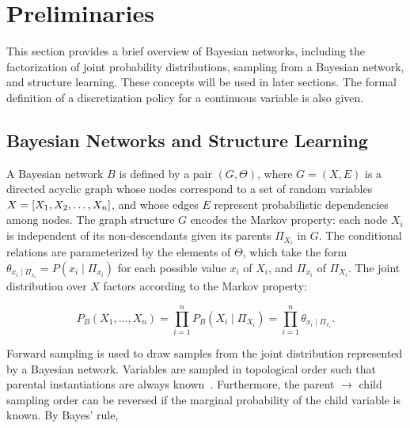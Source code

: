 
\section{Preliminaries}
\label{sec:preliminaries}
This section provides a brief overview of Bayesian networks, including the factorization of joint probability distributions, sampling from a Bayesian network, and structure learning. These concepts will be used in later sections. The formal definition of a discretization policy for a continuous variable is also given.

\subsection{Bayesian Networks and Structure Learning}


A Bayesian network $B$ is defined by a pair $(G,\Theta)$, where $G = (X,E)$ is a directed acyclic graph whose nodes correspond to a set of random variables $X = \brock{X_1, X_2, \ldots, X_n}$, and whose edges $E$ represent probabilistic dependencies among nodes.
The graph structure $G$ encodes the Markov property: each node $X_i$ is independent of its non-descendants given its parents $\Pi_{X_i}$ in $G$.
The conditional relations are parameterized by the elements of $\Theta$, which take the form $\theta_{x_i \mid \Pi_{x_i}} = P(x_i \mid \Pi_{x_i})$ for each possible value $x_i$ of $X_i$, and $\Pi_{x_i}$ of $\Pi_{X_i}$. The joint distribution over $X$ factors according to the Markov property:

\begin{equation}
P_B (X_1 , \ldots, X_n) = \prod_{i=1}^{n} P_B (X_i \mid \Pi_{X_i}) = \prod_{i=1}^{n} \theta_{x_i \mid \Pi_{x_i}}\text{.}
\end{equation}

Forward sampling is used to draw samples from the joint distribution represented by a Bayesian network.
Variables are sampled in topological order such that parental instantiations are always known~\citep[see][chap.~22]{algo_2009}.
Furthermore, the parent $\rightarrow$ child sampling order can be reversed if the marginal probability of the child variable is known.
By Bayes' rule,

